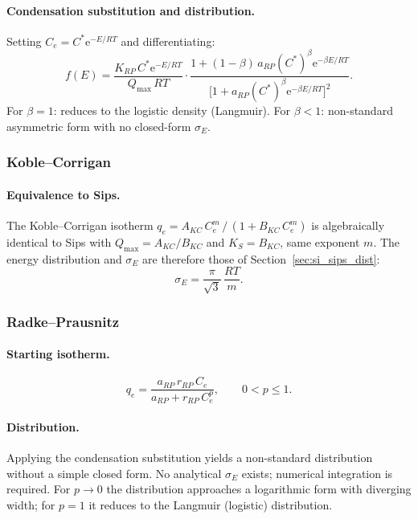 \documentclass[journal=aamick,manuscript=article]{achemso}
\begin{document}
\paragraph{Condensation substitution and distribution.}
Setting $C_e = C^{\ast}\mathrm{e}^{-E/RT}$ and differentiating:
\begin{equation}
	f(E) = \frac{K_{RP}\,C^{\ast}\mathrm{e}^{-E/RT}}{Q_{\max}\,RT}
	\cdot\frac{1+(1-\beta)\,a_{RP}(C^{\ast})^{\beta}\mathrm{e}^{-\beta E/RT}}
	          {\bigl[1+a_{RP}(C^{\ast})^{\beta}\mathrm{e}^{-\beta E/RT}\bigr]^{2}}.
	\label{eq:si_fE_RP}
\end{equation}
For $\beta = 1$: reduces to the logistic density (Langmuir). For $\beta < 1$:
non-standard asymmetric form with no closed-form $\sigma_E$.

\subsubsection{Koble--Corrigan}

\paragraph{Equivalence to Sips.}
The Koble--Corrigan isotherm
$q_e = A_{KC}\,C_e^{m}\,/\,(1 + B_{KC}\,C_e^{m})$
is algebraically identical to Sips with $Q_{\max} = A_{KC}/B_{KC}$ and
$K_S = B_{KC}$, same exponent $m$.
The energy distribution and $\sigma_E$ are therefore those of
Section~\ref{sec:si_sips_dist}:
\begin{equation}
	\sigma_E = \frac{\pi}{\sqrt{3}}\,\frac{RT}{m}.
\end{equation}

\subsubsection{Radke--Prausnitz}

\paragraph{Starting isotherm.}
\begin{equation}
	q_e = \frac{a_{RP}\,r_{RP}\,C_e}{a_{RP} + r_{RP}\,C_e^{p}},
	\qquad 0 < p \leq 1.
\end{equation}

\paragraph{Distribution.}
Applying the condensation substitution yields a non-standard distribution
without a simple closed form. No analytical $\sigma_E$ exists; numerical
integration is required. For $p \to 0$ the distribution approaches a
logarithmic form with diverging width; for $p = 1$ it reduces to the
Langmuir (logistic) distribution.
\end{document}
